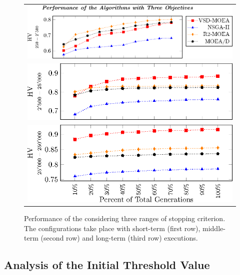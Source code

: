 \begin{figure}[t]
\centering
%
\begin{tabular}{l}
 \includegraphics[scale=0.6]{Images/Time_tikz-figure3.eps}\\[0cm]%
 \includegraphics[scale=0.6]{Images/Time_tikz-figure4.eps}\\[0cm]%
 \includegraphics[scale=0.6]{Images/Time_tikz-figure5.eps}
\end{tabular}
\caption{Performance of the \MOEAS{} considering three ranges of stopping criterion. The configurations take place with short-term (first row), middle-term (second row) and long-term (third row) executions.}\label{fig:Performance_time_3obj}
\end{figure}


\subsection{Analysis of the Initial Threshold Value}

